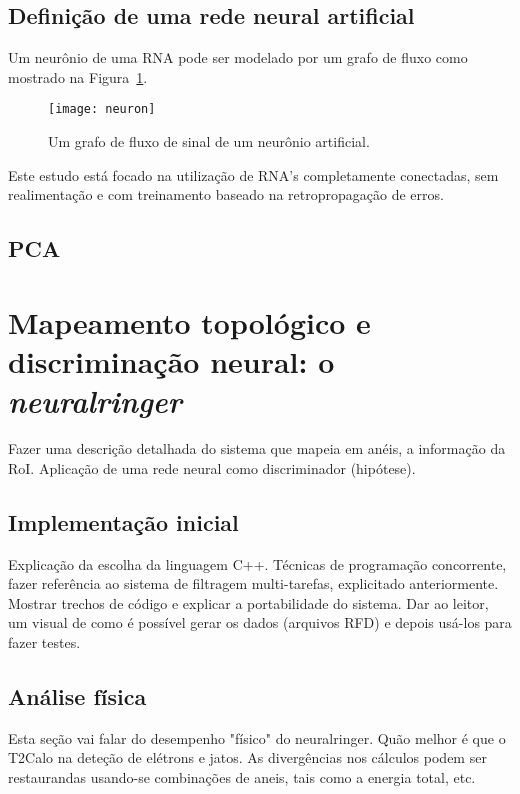 \subsection{Definição de uma rede neural artificial}

Um neurônio de uma RNA pode ser modelado por um grafo de fluxo como mostrado
na Figura~\ref{fig:neuron}.

\begin{figure}
\begin{center}
\texttt{[image: neuron]}
\end{center}
\caption{Um grafo de fluxo de sinal de um neurônio artificial.}
\label{fig:neuron}
\end{figure}

Este estudo está focado na utilização de RNA's completamente conectadas, sem
realimentação e com treinamento baseado na retropropagação de erros.

\subsection{PCA}

\section{Mapeamento topológico e discriminação neural: o \emph{neuralringer}}

Fazer uma descrição detalhada do sistema que mapeia em anéis, a informação da
RoI. Aplicação de uma rede neural como discriminador (hipótese).

\subsection{Implementação inicial}

Explicação da escolha da linguagem C++. Técnicas de programação concorrente,
fazer referência ao sistema de filtragem multi-tarefas, explicitado
anteriormente. Mostrar trechos de código e explicar a portabilidade do
sistema. Dar ao leitor, um visual de como é possível gerar os dados (arquivos
RFD) e depois usá-los para fazer testes.

\subsection{Análise física}

Esta seção vai falar do desempenho "físico" do neuralringer. Quão melhor é que
o T2Calo na deteção de elétrons e jatos. As divergências nos cálculos podem
ser restaurandas usando-se combinações de aneis, tais como a energia total,
etc.

